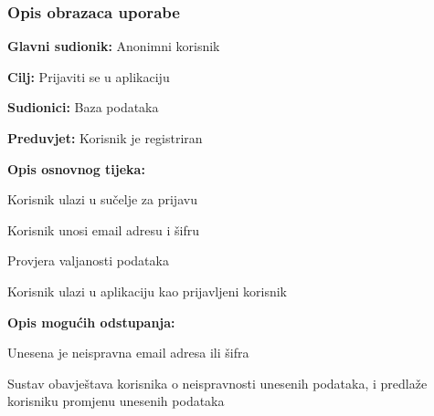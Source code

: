 \subsubsection{Opis obrazaca uporabe}

\noindent {}
\begin{packed_item}

\item \textbf{Glavni sudionik:} Anonimni korisnik
\item  \textbf{Cilj:} Prijaviti se u aplikaciju
\item  \textbf{Sudionici:} Baza podataka
\item  \textbf{Preduvjet:} Korisnik je registriran
\item  \textbf{Opis osnovnog tijeka:}

\item[] \begin{packed_enum}

    \item Korisnik ulazi u sučelje za prijavu
    \item Korisnik unosi email adresu i šifru
    \item Provjera valjanosti podataka
    \item Korisnik ulazi u aplikaciju kao prijavljeni korisnik

\end{packed_enum}

\item  \textbf{Opis mogućih odstupanja:}

\item[] \begin{packed_item}

    \item[3.a] Unesena je neispravna email adresa ili šifra

    \item[] \begin{packed_enum}

        \item Sustav obavještava korisnika o neispravnosti unesenih podataka, i predlaže korisniku promjenu unesenih podataka

    \end{packed_enum}

\end{packed_item}

\end{packed_item}

